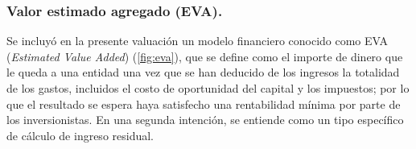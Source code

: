 \begin{rightcolumn}
\subsubsection*{Valor estimado agregado (EVA).}

Se incluyó en la presente valuación un modelo financiero conocido como EVA (\textit{Estimated Value Added}) (\ref{fig:eva}), que se define como el importe de dinero que le queda a una entidad una vez que se han deducido de los ingresos la totalidad de los gastos, incluidos el costo de oportunidad del capital y los impuestos; por lo que el resultado se espera haya satisfecho una rentabilidad mínima por parte de los inversionistas. En una segunda intención, se entiende como un tipo específico de cálculo de ingreso residual.

\end{rightcolumn}

\begin{leftcolumn}
\begin{figure}[H]
\end{figure}
\end{leftcolumn}